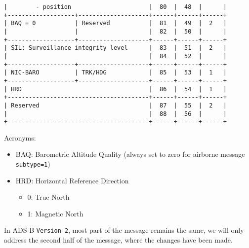 \begin{verbatim}
|        - position                      |  80  |  48  |      |
+-------------------+--------------------+------+------+------+
| BAQ = 0           | Reserved           |  81  |  49  |  2   |
|                   |                    |  82  |  50  |      |
+-------------------+--------------------+------+------+------+
| SIL: Surveillance integrity level      |  83  |  51  |  2   |
|                                        |  84  |  52  |      |
+-------------------+--------------------+------+------+------+
| NIC-BARO          | TRK/HDG            |  85  |  53  |  1   |
+-------------------+--------------------+------+------+------+
| HRD                                    |  86  |  54  |  1   |
+----------------------------------------+------+------+------+
| Reserved                               |  87  |  55  |  2   |
|                                        |  88  |  56  |      |
+----------------------------------------+------+------+------+
\end{verbatim}

Acronyms:

\begin{itemize}

\item
  BAQ: Barometric Altitude Quality (always set to zero for airborne
  message \texttt{subtype=1})
\item
  HRD: Horizontal Reference Direction

  \begin{itemize}

  \item
    0: True North
  \item
    1: Magnetic North
  \end{itemize}
\end{itemize}

In ADS-B \texttt{Version\ 2}, most part of the message remains the same,
we will only address the second half of the message, where the changes
have been made.

